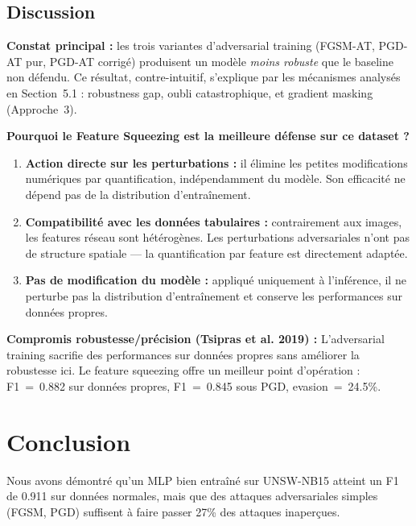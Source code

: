 \documentclass[11pt,a4paper]{article}
\begin{document}
\subsection{Discussion}

\textbf{Constat principal :} les trois variantes d'adversarial training (FGSM-AT, PGD-AT pur, PGD-AT corrig\'e) produisent
un mod\`ele \emph{moins robuste} que le baseline non d\'efendu.
Ce r\'esultat, contre-intuitif, s'explique par les m\'ecanismes analys\'es en Section~5.1 :
robustness gap, oubli catastrophique, et gradient masking (Approche~3).

\textbf{Pourquoi le Feature Squeezing est la meilleure d\'efense sur ce dataset ?}

\begin{enumerate}[leftmargin=1.5em]
    \item \textbf{Action directe sur les perturbations :} il \'elimine les petites
    modifications num\'eriques par quantification, ind\'ependamment du mod\`ele.
    Son efficacit\'e ne d\'epend pas de la distribution d'entra\^inement.
    \item \textbf{Compatibilit\'e avec les donn\'ees tabulaires :} contrairement aux images,
    les features r\'eseau sont h\'et\'erog\`enes. Les perturbations adversariales n'ont pas
    de structure spatiale --- la quantification par feature est directement adapt\'ee.
    \item \textbf{Pas de modification du mod\`ele :} appliqu\'e uniquement \`a l'inf\'erence,
    il ne perturbe pas la distribution d'entra\^inement et conserve les performances sur donn\'ees propres.
\end{enumerate}

\textbf{Compromis robustesse/pr\'ecision (Tsipras et al. 2019) :}
L'adversarial training sacrifie des performances sur donn\'ees propres sans am\'eliorer la robustesse ici.
Le feature squeezing offre un meilleur point d'op\'eration : F1~=~0.882 sur donn\'ees propres,
F1~=~0.845 sous PGD, evasion~=~24.5\%.

\section{Conclusion}

Nous avons d\'emontr\'e qu'un MLP bien entra\^in\'e sur UNSW-NB15 atteint un F1 de 0.911 sur
donn\'ees normales, mais que des attaques adversariales simples (FGSM, PGD) suffisent \`a faire
passer 27\% des attaques inaper\c{c}ues.
\end{document}
